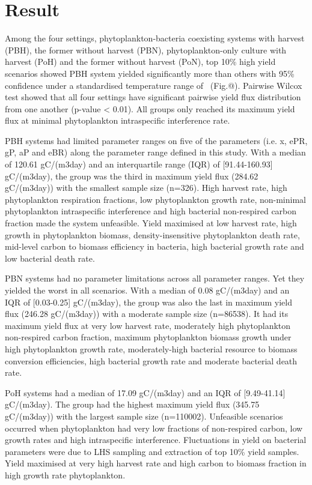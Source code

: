 \documentclass[../thesis.tex]{subfiles} %
\begin{document}
\section{Result}
Among the four settings, phytoplankton-bacteria coexisting systems with harvest (PBH), the former without harvest (PBN), phytoplankton-only culture with harvest (PoH) and the former without harvest (PoN), top 10\% high yield scenarios showed PBH system yielded significantly more than others with 95\% confidence under a standardised temperature range of \temp\ (Fig.@).  Pairwise Wilcox test showed that all four settings have significant pairwise yield flux distribution from one another (p-value < 0.01).  All groups only reached its maximum yield flux at minimal phytoplankton intraspecific interference rate.

PBH systems had limited parameter ranges on five of the parameters (i.e. x, ePR, gP, aP and eBR) along the parameter range defined in this study.  With a median of 120.61 gC/(m3day) and an interquartile range (IQR) of [91.44-160.93] gC/(m3day), the group was the third in maximum yield flux (284.62 gC/(m3day)) with the smallest sample size (n=326).  High harvest rate, high phytoplankton respiration fractions, low phytoplankton growth rate, non-minimal phytoplankton intraspecific interference and high bacterial non-respired carbon fraction made the system unfeasible.  Yield maximised at low harvest rate, high growth in phytoplankton biomass, density-insensitive phytoplankton death rate, mid-level carbon to biomass efficiency in bacteria, high bacterial growth rate and low bacterial death rate.

PBN systems had no parameter limitations across all parameter ranges.  Yet they yielded the worst in all scenarios.  With a median of 0.08 gC/(m3day) and an IQR of [0.03-0.25] gC/(m3day), the group was also the last in maximum yield flux (246.28 gC/(m3day)) with a moderate sample size (n=86538).  It had its maximum yield flux at very low harvest rate, moderately high phytoplankton non-respired carbon fraction, maximum phytoplankton biomass growth under high phytoplankton growth rate, moderately-high bacterial resource to biomass conversion efficiencies, high bacterial growth rate and moderate bacterial death rate.  

PoH systems had a median of 17.09 gC/(m3day) and an IQR of [9.49-41.14] gC/(m3day).  The group had the highest maximum yield flux (345.75 gC/(m3day)) with the largest sample size (n=110002).  Unfeasible scenarios occurred when phytoplankton had very low fractions of non-respired carbon, low growth rates and high intraspecific interference.  Fluctuations in yield on bacterial parameters were due to LHS sampling and extraction of top 10\% yield samples.  Yield maximised at very high harvest rate and high carbon to biomass fraction in high growth rate phytoplankton.
\end{document}
